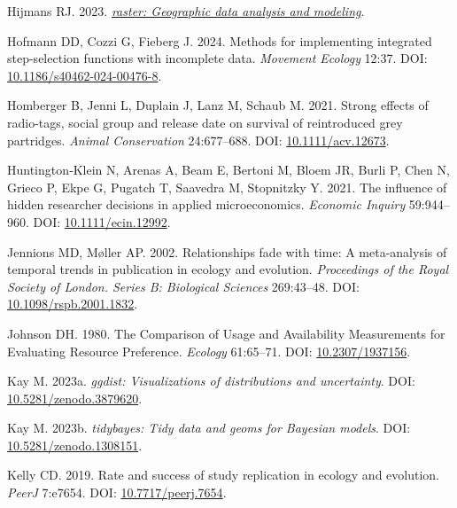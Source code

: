 \documentclass[10pt,a4paper]{article}
\newlength{\cslhangindent}
\newenvironment{CSLReferences}[2] %
 {\begin{list}{}{%
  \setlength{\itemindent}{0pt}
  \setlength{\leftmargin}{0pt}
  \setlength{\parsep}{0pt}
  \ifodd #1
   \setlength{\leftmargin}{\cslhangindent}
   \setlength{\itemindent}{-1\cslhangindent}
  \fi
  \setlength{\itemsep}{#2\baselineskip}}}
 {\end{list}}
\begin{document}
\begin{CSLReferences}{1}{0}
Hijmans RJ. 2023. \emph{\href{https://CRAN.R-project.org/package=raster}{{raster}: Geographic data analysis and modeling}}.

Hofmann DD, Cozzi G, Fieberg J. 2024. Methods for implementing integrated step-selection functions with incomplete data. \emph{Movement Ecology} 12:37. DOI: \href{https://doi.org/10.1186/s40462-024-00476-8}{10.1186/s40462-024-00476-8}.

Homberger B, Jenni L, Duplain J, Lanz M, Schaub M. 2021. Strong effects of radio-tags, social group and release date on survival of reintroduced grey partridges. \emph{Animal Conservation} 24:677--688. DOI: \href{https://doi.org/10.1111/acv.12673}{10.1111/acv.12673}.

Huntington‐Klein N, Arenas A, Beam E, Bertoni M, Bloem JR, Burli P, Chen N, Grieco P, Ekpe G, Pugatch T, Saavedra M, Stopnitzky Y. 2021. The influence of hidden researcher decisions in applied microeconomics. \emph{Economic Inquiry} 59:944--960. DOI: \href{https://doi.org/10.1111/ecin.12992}{10.1111/ecin.12992}.

Jennions MD, Møller AP. 2002. Relationships fade with time: A meta-analysis of temporal trends in publication in ecology and evolution. \emph{Proceedings of the Royal Society of London. Series B: Biological Sciences} 269:43--48. DOI: \href{https://doi.org/10.1098/rspb.2001.1832}{10.1098/rspb.2001.1832}.

Johnson DH. 1980. The {Comparison} of {Usage} and {Availability} {Measurements} for {Evaluating} {Resource} {Preference}. \emph{Ecology} 61:65--71. DOI: \href{https://doi.org/10.2307/1937156}{10.2307/1937156}.

Kay M. 2023a. \emph{{ggdist}: Visualizations of distributions and uncertainty}. DOI: \href{https://doi.org/10.5281/zenodo.3879620}{10.5281/zenodo.3879620}.

Kay M. 2023b. \emph{{tidybayes}: Tidy data and geoms for {Bayesian} models}. DOI: \href{https://doi.org/10.5281/zenodo.1308151}{10.5281/zenodo.1308151}.

Kelly CD. 2019. Rate and success of study replication in ecology and evolution. \emph{PeerJ} 7:e7654. DOI: \href{https://doi.org/10.7717/peerj.7654}{10.7717/peerj.7654}.


\end{CSLReferences}
\end{document}
